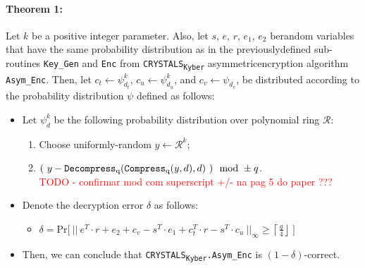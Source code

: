 \documentclass[runningheads]{llncs}
\numberwithin{equation}{section}
\begin{document}
    \paragraph{\textbf{Theorem 1:}} Let $k$ be a positive integer parameter. Also, let $s$, $e$, $r$, ${e}_{1}$, ${e}_{2}$ be\break random variables that have the same probability distribution as in the previously\break defined sub-routines \texttt{Key\_Gen} and \texttt{Enc} from \texorpdfstring{\texttt{CRYSTALS}\textsubscript{\texttt{Kyber}}}\/ asymmetric\break encryption algorithm \texttt{Asym\_Enc}. Then, let ${c}_{t} \gets {\psi}_{{d}_{t}}^{k}$, ${c}_{u} \gets {\psi}_{{d}_{u}}^{k}$, and ${c}_{v} \gets {\psi}_{{d}_{v}}$, be distributed according to the probability distribution $\psi$ defined as follows:

    \begin{itemize}
        
        \item Let ${\psi}_{d}^{k}$ be the following probability distribution over polynomial ring $\mathcal{R}$:
        
        \begin{enumerate}
            \item Choose uniformly-random $y \gets {\mathcal{R}}^{k}$;
            \item \Return $(\ y - \mathrm{\texttt{Decompress}}\textsubscript{q}( \mathrm{\texttt{Compress}}\textsubscript{q}(y, d), d )\ ) \mod \pm q$.\\ \textcolor{red}{TODO - confirmar mod com superscript +/- na pag 5 do paper ???}
        \end{enumerate}

        \item Denote the decryption error $\delta$ as follows:
        \begin{itemize}
            \item $\delta = \mathrm{Pr}\Big[\ { \big|\big|\ {e}^{T} \cdot r + {e}_{2} + {c}_{v} - {s}^{T} \cdot {e}_{1} + {c}_{t}^{T} \cdot r - {s}^{T} \cdot {c}_{u}\ \big|\big| }_{\infty} \geq \left\lceil \frac{q}{4} \right\rfloor \ \Big]$
        \end{itemize}

        \item Then, we can conclude that \texorpdfstring{\texttt{CRYSTALS}\textsubscript{\texttt{Kyber}}\texttt{.Asym\_Enc}}\/ is $( 1 - \delta )$-correct.
        
    \end{itemize}
    
\end{document}
